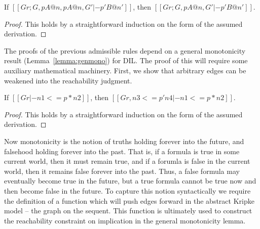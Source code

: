 \begin{lemma}[Contraction]
  \label{lemma:contract}
  If $[[Gr ; G , p A @ n , p A @ n , G' |- p' B @ n']]$, then
  $[[Gr ; G , p A @ n , G' |- p' B @ n']]$.
\end{lemma}
\begin{proof}
  This holds by a straightforward induction on the form of the assumed derivation.
\end{proof}

The proofs of the previous admissible rules depend on a general
monotonicity result (Lemma~\ref{lemma:genmono}) for DIL.  The proof of
this will require some auxiliary mathematical machinery. First, we
show that arbitrary edges can be weakened into the reachability
judgment.
\begin{lemma}
  \label{lemma:graph_weakening}
  If $[[Gr |- n1 <= p * n2]]$, then $[[Gr, n3 <= p' n4 |- n1 <= p * n2]]$.
\end{lemma}
\begin{proof}
  This holds by a straightforward induction on the form of the assumed derivation.
\end{proof}
Now monotonicity is the notion of truths holding forever into the
future, and falsehood holding forever into the past.  That is, if a
formula is true in some current world, then it must remain true, and
if a forumla is false in the current world, then it remains false
forever into the past.  Thus, a false formula may eventually become true
in the future, but a true formula cannot be true now and then become
false in the future.  To capture this notion syntactically we require
the definition of a function which will push edges forward in the
abstract Kripke model -- the graph on the sequent.   This function is
ultimately used to construct the reachability constraint on
implication in the general monotonicity lemma.
